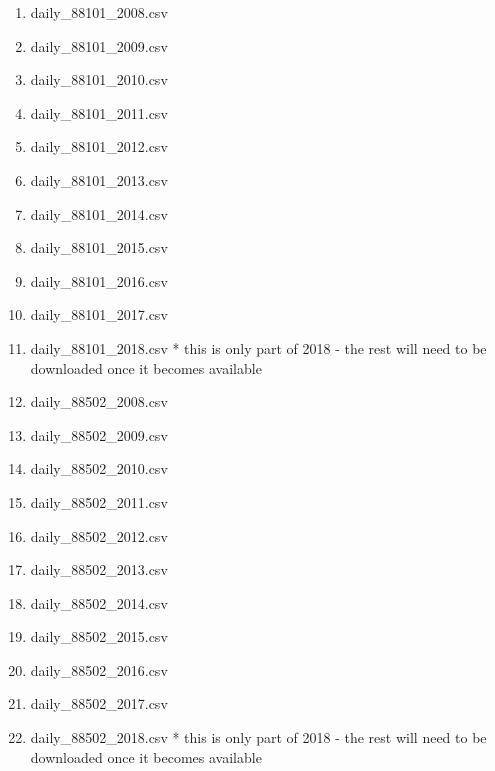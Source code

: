 \begin{enumerate}[noitemsep]
\item daily\_88101\_2008.csv
\item daily\_88101\_2009.csv
\item daily\_88101\_2010.csv
\item daily\_88101\_2011.csv
\item daily\_88101\_2012.csv
\item daily\_88101\_2013.csv
\item daily\_88101\_2014.csv
\item daily\_88101\_2015.csv
\item daily\_88101\_2016.csv
\item daily\_88101\_2017.csv
\item daily\_88101\_2018.csv * this is only part of 2018 - the rest will need to be downloaded once it becomes available
\item daily\_88502\_2008.csv
\item daily\_88502\_2009.csv
\item daily\_88502\_2010.csv
\item daily\_88502\_2011.csv
\item daily\_88502\_2012.csv
\item daily\_88502\_2013.csv
\item daily\_88502\_2014.csv
\item daily\_88502\_2015.csv
\item daily\_88502\_2016.csv
\item daily\_88502\_2017.csv
\item daily\_88502\_2018.csv * this is only part of 2018 - the rest will need to be downloaded once it becomes available
\end{enumerate} 

